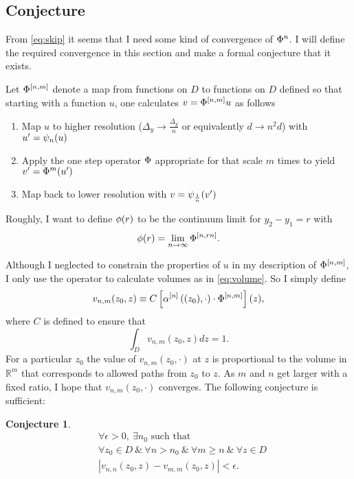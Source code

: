 \documentclass[twocolumn]{article}
\newcommand{\field}[1]{\mathbb{#1}}
\newcommand\REAL{\field{R}}
\newtheorem{conj}{Conjecture}
\begin{document}
\subsection{Conjecture}
\label{sec:conjecture}

From \eqref{eq:skip} it seems that I need some kind of convergence of
$\Phi^n$.  I will define the required convergence in this section and
make a formal conjecture that it exists.

Let $\Phi^{[n,m]}$ denote a map from functions on $D$ to
functions on $D$ defined so that starting with a function $u$, one
calculates $v = \Phi^{[n,m]}u$ as follows
\begin{enumerate}
\item Map $u$ to higher resolution ($\Delta_y \rightarrow
\frac{\Delta_y}{n}$ or equivalently $d \rightarrow n^2 d$) with
$u' = \psi_{n}(u)$
\item Apply the one step operator $\Phi$ appropriate for that scale
  $m$ times to yield $v' = \Phi^m(u')$
\item Map back to lower resolution with $v = \psi_{\frac{1}{n}}(v')$
\end{enumerate}

Roughly, I want to define $\phi(r)$ to be the continuum limit for
$y_2 - y_1 =r$ with
\begin{equation}
  \label{eq:phir}
  \phi(r) = \lim_{n \rightarrow \infty} \Phi^{[n,rn]}.
\end{equation}

Although I neglected to constrain the properties of $u$ in my
description of $\Phi^{[n,m]}$, I only use the operator to
calculate volumes as in \eqref{eq:volume}.  So I simply define
\begin{equation}
  \label{eq:def}
  v_{n,m}(z_0,z) \equiv C \left[
    \alpha^{[n]} \left( (z_0), \cdot \right)
    \cdot \Phi^{[n,m]}
  \right](z),
\end{equation}
where $C$ is defined to ensure that
\begin{equation*}
  \int_D v_{n,m}(z_0,z) dz = 1.
\end{equation*}
For a particular $z_0$ the value of $v_{n,m}(z_0,\cdot)$ at $z$ is
proportional to the volume in $\REAL^m$ that corresponds to allowed
paths from $z_0$ to $z$.  As $m$ and $n$ get larger with a fixed
ratio, I hope that $v_{n,m}(z_0,\cdot)$ converges.  The following
conjecture is sufficient:
\begin{conj}
  \label{conj}
  \begin{align*}
    & \forall \epsilon > 0,~ \exists n_0 \text{ such that } \\
    & \forall z_0 \in D ~\&~ \forall n > n_0 ~\&~ \forall m \geq n ~\&~
              \forall z \in D\\
    & \left| v_{n,n}(z_0,z) - v_{m,m}(z_0,z) \right| < \epsilon.
  \end{align*}
\end{conj}
\end{document}
